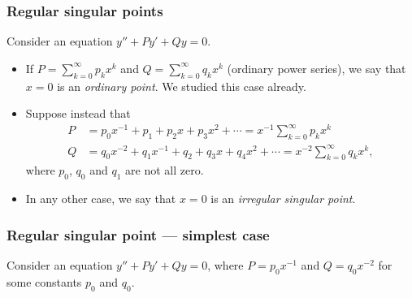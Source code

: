 \documentclass[9pt]{beamer}
\begin{document}
\begin{frame}[t]
 \frametitle{Regular singular points}
 
 Consider an equation $y''+Py'+Qy=0$.  
 \begin{itemize}
  \item<2-> If $P=\sum_{k=0}^\infty p_kx^k$ and $Q=\sum_{k=0}^\infty q_kx^k$
   (ordinary power series), we say that $x=0$ is an \emph{ordinary point}.
   We studied this case already.
  \item<3-> Suppose instead that
   \begin{align*}
    P &= p_0x^{-1} + p_1 + p_2x + p_3x^2 +\dotsb
       = x^{-1}\sum_{k=0}^\infty p_kx^k \\
    Q &= q_0x^{-2} + q_1x^{-1} + q_2 + q_3x + q_4x^2 +\dotsb
       = x^{-2}\sum_{k=0}^\infty q_kx^k,
   \end{align*}
   where $p_0$, $q_0$ and $q_1$ are not all zero.  
  \item<6-> In any other case, we say that $x=0$ is an \emph{irregular
   singular point}.
 \end{itemize}
\end{frame}

\begin{frame}[t]
 \frametitle{Regular singular point --- simplest case}
 
 Consider an equation $y''+Py'+Qy=0$, where $P=p_0x^{-1}$ and
 $Q=q_0x^{-2}$ for some constants $p_0$ and $q_0$.  
\end{frame}
\end{document}
